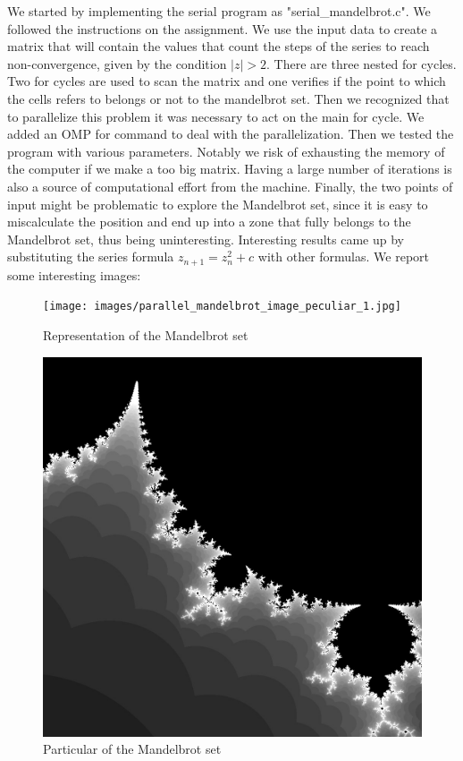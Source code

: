 \documentclass{article}
\begin{document}
We started by implementing the serial program as "serial\_mandelbrot.c". We followed the instructions on the assignment.
We use the input data to create a matrix that will contain the values that count the steps of the series to reach non-convergence, given by the condition $\left|z\right|>2$.
There are three nested for cycles. Two for cycles are used to scan the matrix and one verifies if the point to which the cells refers to belongs or not to the mandelbrot set.
Then we recognized that to parallelize this problem it was necessary to act on the main for cycle. We added an OMP for command to deal with the parallelization.
Then we tested the program with various parameters. Notably we risk of exhausting the memory of the computer if we make a too big matrix. Having a large number of iterations is also a source of computational effort from the machine. Finally, the two points of input might be problematic to explore the Mandelbrot set, since it is easy to miscalculate the position and end up into a zone that fully belongs to the Mandelbrot set, thus being uninteresting. 
Interesting results came up by substituting the series formula $z_{n+1} = z^{2}_n + c$ with other formulas. We report some interesting images:




\begin{figure}[H] %
	\centering
	\texttt{[image: images/parallel\_mandelbrot\_image\_peculiar\_1.jpg]} %
	\caption{Representation of the Mandelbrot set}
\end{figure}

\begin{figure}[H] %
	\centering
	\includegraphics[width=0.5\columnwidth]{images/mandelbrot_image_peculiar_1} %
	\caption{Particular of the Mandelbrot set}
\end{figure}
\end{document}
